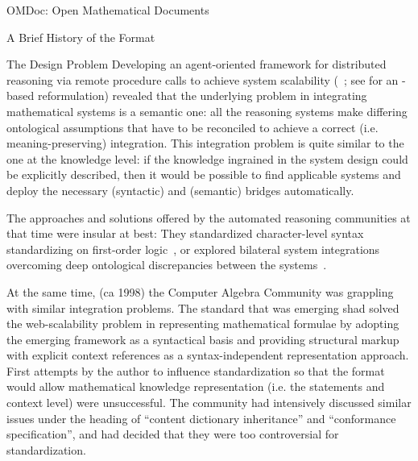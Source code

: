 \begin{tchapter}[id=omdoc-markup,short=Open Mathematical Documents]{OMDoc: Open Mathematical Documents}
\begin{tsection}[id=omdoc-history]{A Brief History of the {\omdoc} Format}
\begin{tsubsection}{The Design Problem}
      Developing an agent-oriented framework for distributed reasoning via remote
      procedure calls to achieve system scalability
      (\mathwebsb~\cite{FraKoh:mabdl99,ZimKoh:tmsbdmr02}; see {} for an
      {\omdoc}-based reformulation) revealed that the underlying problem in integrating
      mathematical systems is a semantic one: all the reasoning systems make differing
      ontological assumptions that have to be reconciled to achieve a correct
      (i.e. meaning-preserving) integration. This integration problem is quite similar to
      the one at the knowledge level: if the knowledge ingrained in the system design
      could be explicitly described, then it would be possible to find applicable systems
      and deploy the necessary (syntactic) and (semantic) bridges automatically.

      The approaches and solutions offered by the automated reasoning communities at that
      time were insular at best: They standardized character-level syntax standardizing on
      first-order logic~\cite{SuSu94,HaeKerWei:csdfgsd96}, or explored bilateral system
      integrations overcoming deep ontological discrepancies between the
      systems~\cite{FelHow:hitpnh97}.

      At the same time, (ca 1998) the Computer Algebra Community was grappling with
      similar integration problems. The {\openmath} standard that was emerging shad solved
      the web-scalability problem in representing mathematical formulae by adopting the
      emerging {\xml} framework as a syntactical basis and providing structural markup
      with explicit context references as a syntax-independent representation
      approach. First attempts by the author to influence {\openmath} standardization so
      that the format would allow mathematical knowledge representation (i.e. the
      statements and context level) were unsuccessful. The {\openmath} community had
      intensively discussed similar issues under the heading of ``content dictionary
      inheritance'' and ``conformance specification'', and had decided that they were too
      controversial for standardization.
  \end{tsubsection}


\end{tsection}
\end{tchapter}
